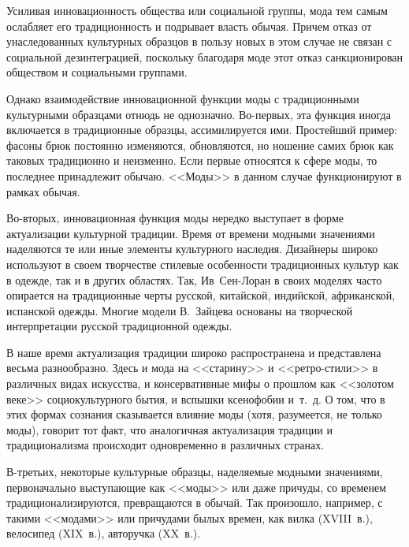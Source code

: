   Усиливая инновационность общества или социальной группы, мода тем самым
  ослабляет его традиционность и подрывает власть обычая. Причем отказ от
  унаследованных культурных образцов в пользу новых в этом случае не связан с
  социальной дезинтеграцией, поскольку благодаря моде этот отказ санкционирован
  обществом и социальными группами.
  
  Однако взаимодействие инновационной функции моды с традиционными культурными
  образцами отнюдь не однозначно. Во-первых, эта функция иногда включается в
  традиционные образцы, ассимилируется ими. Простейший пример: фасоны брюк
  постоянно изменяются, обновляются, но ношение самих брюк как таковых
  традиционно и неизменно. Если первые относятся к сфере моды, то последнее
  принадлежит обычаю. <<Моды>> в данном случае функционируют в рамках обычая.
  
  Во-вторых, инновационная функция моды нередко выступает в форме актуализации
  культурной традиции. Время от времени модными значениями наделяются те или
  иные элементы культурного наследия. Дизайнеры широко используют в своем
  творчестве стилевые особенности традиционных культур как в одежде, так и в
  других областях. Так, Ив~Сен-Лоран в своих моделях часто опирается на
  традиционные черты русской, китайской, индийской, африканской, испанской
  одежды. Многие модели В.~Зайцева основаны на творческой интерпретации русской
  традиционной одежды.
  
  В наше время актуализация традиции широко распространена и представлена весьма
  разнообразно. Здесь и мода на <<старину>> и <<ретро-стили>> в различных видах
  искусства, и консервативные мифы о прошлом как <<золотом веке>>
  социокультурного бытия, и вспышки ксенофобии и~т.~д. О том, что в этих формах
  сознания сказывается влияние моды (хотя, разумеется, не только моды), говорит
  тот факт, что аналогичная актуализация традиции и традиционализма происходит
  одновременно в различных странах.
  
  В-третьих, некоторые культурные образцы, наделяемые модными значениями,
  первоначально выступающие как <<моды>> или даже причуды, со временем
  традиционализируются, превращаются в обычай. Так произошло, например, с такими
  <<модами>> или причудами былых времен, как вилка (XVIII~в.), велосипед
  (XIX~в.), авторучка (XX~в.).
  
